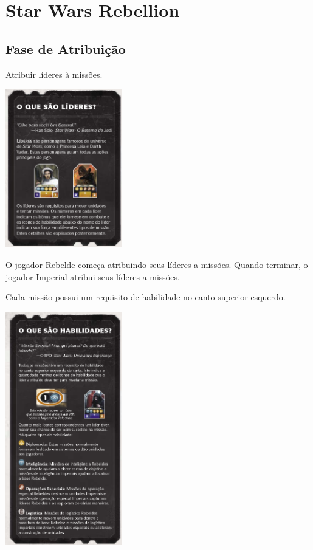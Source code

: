 \documentclass[11pt]{article}
\author{Fabio Favero Henkes}
\date{\today}
\title{}
\begin{document}
\tableofcontents


\section{Star Wars Rebellion}
\label{sec:org12d429a}

\subsection{Fase de Atribuição}
\label{sec:orgcca3c0c}

Atribuir líderes à missões.

\begin{center}
\includegraphics[width=2.0in]{./lider.png}
\end{center}

O jogador Rebelde começa atribuindo seus líderes a missões. Quando terminar, o jogador Imperial atribui seus líderes a missões.

Cada missão possui um requisito de habilidade no canto superior esquerdo.

\begin{center}
\includegraphics[width=2.0in]{./skills.png}
\end{center}
\end{document}
